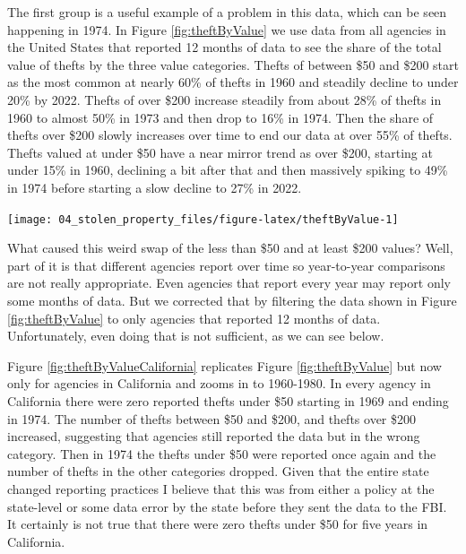 \documentclass[
]{krantz}
\let\origfigure\figure
\let\endorigfigure\endfigure
\renewenvironment{figure}[1][2] {
    \expandafter\origfigure\expandafter[H]
} {
    \endorigfigure
}
\begin{document}
The first group is a useful example of a problem in this
data, which can be seen happening in 1974. In Figure
\ref{fig:theftByValue} we use data from all agencies in the
United States that reported 12 months of data to see the
share of the total value of thefts by the three value
categories. Thefts of between \$50 and \$200 start as the
most common at nearly 60\% of thefts in 1960 and steadily
decline to under 20\% by 2022. Thefts of over \$200 increase
steadily from about 28\% of thefts in 1960 to almost 50\% in
1973 and then drop to 16\% in 1974. Then the share of thefts
over \$200 slowly increases over time to end our data at
over 55\% of thefts. Thefts valued at under \$50 have a near
mirror trend as over \$200, starting at under 15\% in 1960,
declining a bit after that and then massively spiking to
49\% in 1974 before starting a slow decline to 27\% in 2022.

\begin{figure}

{\centering \texttt{[image: 04\_stolen\_property\_files/figure-latex/theftByValue-1]} 

}

\caption{The annual breakdown in total theft value by the three value categories: less than \$50, \$50-\$199, and \$200 and over, among all agencies that reported 12 months of data in that year, 1960-2022.}\label{fig:theftByValue}
\end{figure}

What caused this weird swap of the less than \$50 and at
least \$200 values? Well, part of it is that different
agencies report over time so year-to-year comparisons are
not really appropriate. Even agencies that report every year
may report only some months of data. But we corrected that
by filtering the data shown in Figure \ref{fig:theftByValue}
to only agencies that reported 12 months of data.
Unfortunately, even doing that is not sufficient, as we can
see below.

Figure \ref{fig:theftByValueCalifornia} replicates Figure
\ref{fig:theftByValue} but now only for agencies in
California and zooms in to 1960-1980. In every agency in
California there were zero reported thefts under \$50
starting in 1969 and ending in 1974. The number of thefts
between \$50 and \$200, and thefts over \$200 increased,
suggesting that agencies still reported the data but in the
wrong category. Then in 1974 the thefts under \$50 were
reported once again and the number of thefts in the other
categories dropped. Given that the entire state changed
reporting practices I believe that this was from either a
policy at the state-level or some data error by the state
before they sent the data to the FBI. It certainly is not
true that there were zero thefts under \$50 for five years
in California.
\end{document}
